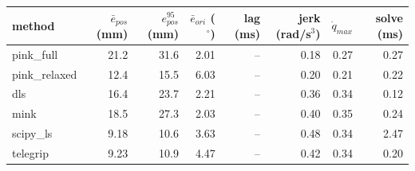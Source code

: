 \begin{tabular}{lrrrrrrr}
\toprule
method & $\bar{e}_{pos}$ (mm) & $e_{pos}^{95}$ (mm) & $\bar{e}_{ori}$ ($^\circ$) & lag (ms) & jerk (rad/s$^3$) & $\dot{q}_{max}$ & solve (ms) \\
\midrule
pink\_full & 21.2 & 31.6 & 2.01 & -- & 0.18 & 0.27 & 0.27 \\
pink\_relaxed & 12.4 & 15.5 & 6.03 & -- & 0.20 & 0.21 & 0.22 \\
dls & 16.4 & 23.7 & 2.21 & -- & 0.36 & 0.34 & 0.12 \\
mink & 18.5 & 27.3 & 2.03 & -- & 0.40 & 0.35 & 0.24 \\
scipy\_ls & 9.18 & 10.6 & 3.63 & -- & 0.48 & 0.34 & 2.47 \\
telegrip & 9.23 & 10.9 & 4.47 & -- & 0.42 & 0.34 & 0.20 \\
\bottomrule
\end{tabular}
